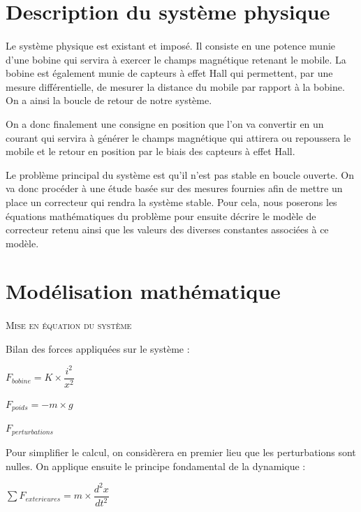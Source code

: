 \documentclass[11pt, french]{article} %
\begin{document}
\section{Description du système physique}
\paragraph{}

Le système physique est existant et imposé. Il consiste en une potence munie d'une bobine qui servira à exercer le champs magnétique retenant le mobile. La bobine est également munie de capteurs à effet Hall qui permettent, par une mesure différentielle, de mesurer la distance du mobile par rapport à la bobine. On a ainsi la boucle de retour de notre système. 

On a donc finalement une consigne en position que l'on va convertir en un courant qui servira à générer le champs magnétique qui attirera ou repoussera le mobile et le retour en position par le biais des capteurs à effet Hall. 

Le problème principal du système est qu'il n'est pas stable en boucle ouverte. On va donc procéder à une étude basée sur des mesures fournies afin de mettre un place un correcteur qui rendra la système stable. Pour cela, nous poserons les équations mathématiques du problème pour ensuite décrire le modèle de correcteur retenu ainsi que les valeurs des diverses constantes associées à ce modèle.

\section{Modélisation mathématique}

\paragraph{}
\textsc{Mise en équation du système}

\noindent
Bilan des forces appliquées sur le système :

\smallskip
$ F_{bobine} = K \times \dfrac{i^2}{x^2}  $

$ F_{poids} = -m \times g $

$ F_{perturbations} $
 \medskip

\noindent
Pour simplifier le calcul, on considèrera en premier lieu que les perturbations sont nulles.
On applique ensuite le principe fondamental de la dynamique :

 \medskip
$ \sum F_{exterieures}  = m \times {\dfrac{{d^2}x}{dt^2}} $
 \medskip
\end{document}
